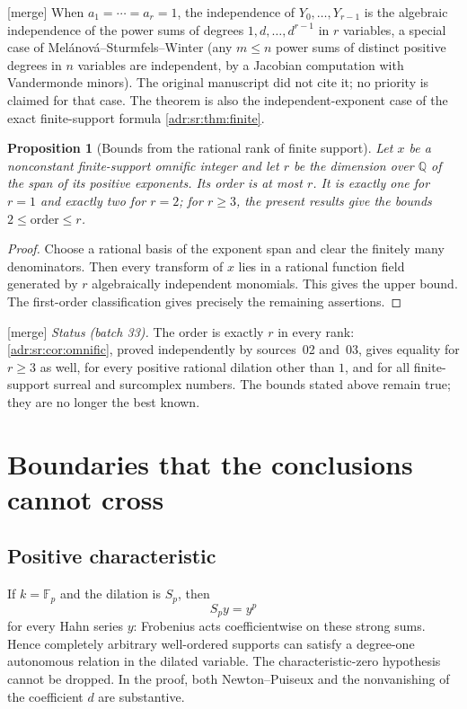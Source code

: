 \documentclass[11pt,letterpaper]{article}
\numberwithin{equation}{section}
\newtheorem{proposition}[proposition]{Proposition}
\theoremstyle{definition}
\theoremstyle{remark}
\newcommand{\Q}{\mathbb Q}
\newcommand{\mtag}{\textup{[merge]}}%
\begin{document}
\mtag{} When $a_1=\cdots=a_r=1$, the independence of $Y_0,\ldots,Y_{r-1}$ is
the algebraic independence of the power sums of degrees $1,d,\ldots,d^{r-1}$
in $r$ variables, a special case of Mel\'anov\'a--Sturmfels--Winter
\cite[Proposition~3]{MSW} (any $m\le n$ power sums of distinct positive
degrees in $n$ variables are independent, by a Jacobian computation with
Vandermonde minors). The original manuscript did not cite it; no priority is
claimed for that case. The theorem is also the independent-exponent case of
the exact finite-support formula \cref{adr:sr:thm:finite}.

\begin{proposition}[Bounds from the rational rank of finite support]
\label{adr:prop:rank-bounds}
Let $x$ be a nonconstant finite-support omnific integer and let $r$ be
the dimension over $\Q$ of the span of its positive exponents. Its
order is at most $r$. It is exactly one for $r=1$ and exactly two for
$r=2$; for $r\ge3$, the present results give the bounds $2\le\text{order}\le r$.
\end{proposition}
\begin{proof}
Choose a rational basis of the exponent span and clear the finitely many
denominators. Then every transform of $x$ lies in a rational function
field generated by $r$ algebraically independent monomials. This gives
the upper bound. The first-order classification gives precisely the
remaining assertions.
\end{proof}

\mtag{} \emph{Status (batch 33).} The order is exactly $r$ in every rank:
\cref{adr:sr:cor:omnific}, proved independently by sources~02 and~03, gives
equality for $r\ge3$ as well, for every positive rational dilation other
than $1$, and for all finite-support surreal and surcomplex numbers. The
bounds stated above remain true; they are no longer the best known.

\section{Boundaries that the conclusions cannot cross}\label{adr:sec:boundaries}

\subsection{Positive characteristic}
If $k=\mathbb F_p$ and the dilation is $S_p$, then
\[
 S_py=y^p
\]
for every Hahn series $y$: Frobenius acts coefficientwise on these
strong sums. Hence completely arbitrary well-ordered supports can satisfy
a degree-one autonomous relation in the dilated variable. The
characteristic-zero hypothesis cannot be dropped. In the proof, both
Newton--Puiseux and the nonvanishing of the coefficient $d$ are substantive.
\end{document}

